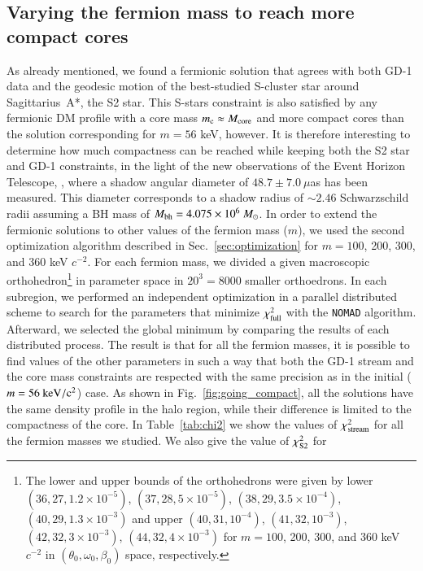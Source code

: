 \documentclass[twocolumn]{aa}
\begin{document}
\subsection{Varying the fermion mass to reach more compact cores}
As already mentioned, we found a fermionic solution that agrees with both GD-1 data and
the geodesic motion of the best-studied S-cluster star around Sagittarius~A*, the S2 star. This S-stars constraint is also satisfied by any fermionic DM profile
with a core mass $m_\mathrm{c}\approx M_{\rm{core}}$ and more compact cores than the solution corresponding for $m=56$ keV, however. It is therefore interesting to determine how much compactness can be reached
while keeping both the S2 star and \hbox{GD-1} constraints, in the light of the new observations
of the Event Horizon Telescope, \cite{EHT_image}, where a shadow angular diameter of $48.7\pm7.0~\mu$as
has been measured. This diameter corresponds to a shadow radius of $\sim 2.46$ Schwarzschild radii assuming
a BH mass of $M_{\rm{bh}}=4.075\times10^6~M_\odot$.
In order to extend the fermionic solutions to other values of the fermion mass ($m$), we used the second optimization algorithm described in Sec.~\ref{sec:optimization} for $m=100$, 200, 300, and 360 keV $c^{-2}$. For each fermion mass, we divided a given macroscopic orthohedron\footnote{The lower and upper bounds of the orthohedrons were given by
lower $(36, 27, 1.2\times10^{-5})$, $(37, 28, 5\times10^{-5})$, $(38, 29, 3.5\times10^{-4})$, $(40, 29, 1.3\times10^{-3})$ and
upper $(40, 31, 10^{-4})$, $(41, 32, 10^{-3})$, $(42, 32, 3\times10^{-3})$, $(44, 32, 4\times10^{-3})$ for $m=100$, 200, 300, and 360 keV $c^{-2}$ in $(\theta_0, \omega_0, \beta_0)$ space, respectively.}
in parameter space in $20^3=8000$ smaller orthoedrons. In each subregion, we performed an independent optimization in a parallel distributed scheme to search for the parameters that minimize $\chi^2_{\rm{full}}$ with the \texttt{NOMAD} algorithm. Afterward, we selected the global minimum by comparing the results of each distributed process.
The result is that for all the fermion masses, it is possible to find values of the other parameters in such a way that both the GD-1 stream and the core mass constraints  are respected with the same precision as in the initial ($m=56~\rm{keV}/c^2$) case. As shown in Fig.~\ref{fig:going_compact}, all the solutions have the same density profile in the halo region, while their difference is limited to the compactness of the core.
In Table~\ref{tab:chi2} we show the values of $\chi^2_{\rm{stream}}$
for all the fermion masses we studied. We also give the value of $\chi^2_{\rm{S2}}$ for
\end{document}
